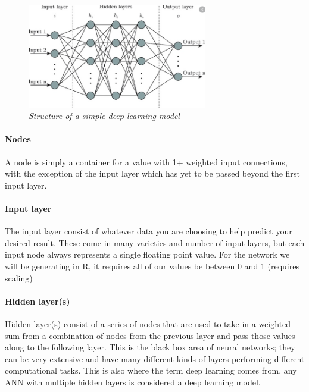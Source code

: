 \documentclass[
]{article}
\begin{document}
\begin{figure}
\centering
\includegraphics[width=0.7\textwidth,height=\textheight]{media/neuralNetDiagram.png}
\caption{\emph{Structure of a simple deep learning model}}
\end{figure}

\hypertarget{nodes}{%
\paragraph{Nodes}\label{nodes}}

A node is simply a container for a value with 1+ weighted input
connections, with the exception of the input layer which has yet to be
passed beyond the first input layer.

\hypertarget{input-layer}{%
\paragraph{Input layer}\label{input-layer}}

The input layer consist of whatever data you are choosing to help
predict your desired result. These come in many varieties and number of
input layers, but each input node always represents a single floating
point value. For the network we will be generating in R, it requires all
of our values be between 0 and 1 (requires scaling)

\hypertarget{hidden-layers}{%
\paragraph{Hidden layer(s)}\label{hidden-layers}}

Hidden layer(s) consist of a series of nodes that are used to take in a
weighted sum from a combination of nodes from the previous layer and
pass those values along to the following layer. This is the black box
area of neural networks; they can be very extensive and have many
different kinds of layers performing different computational tasks. This
is also where the term deep learning comes from, any ANN with multiple
hidden layers is considered a deep learning model.
\end{document}
